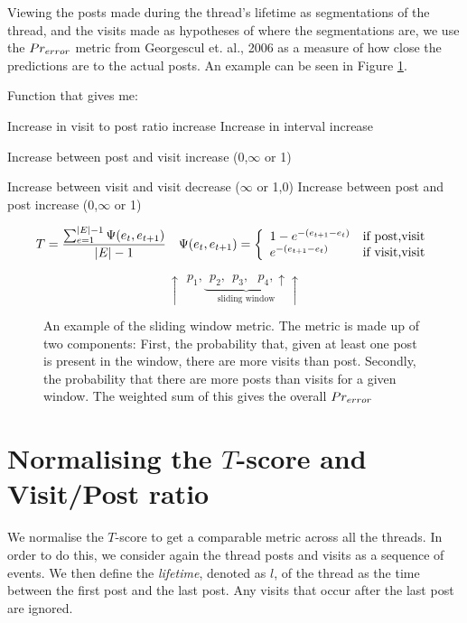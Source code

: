 Viewing the posts made during the thread's lifetime as segmentations of the 
thread, and the visits made as hypotheses of where the segmentations are, we use 
the $Pr_{error}$ metric from Georgescul et. al., 2006 as a measure of how close 
the predictions are to the actual posts. An example can be seen in Figure 
\ref{prerror}.



Function that gives me:

Increase in visit to post ratio		increase
Increase in interval				increase

Increase between post and visit		increase
(0,$\infty$ or 1)

Increase between visit and visit	decrease
($\infty$ or 1,0)
Increase between post and post		increase
(0,$\infty$ or 1)

\[
	\begin{array}{l l}
	T = \dfrac{%
		\sum_{e=1}^{|E|-1} \Psi(e_t,e_{t+1}) %
	}{|E|-1} &
		\Psi(e_t,e_{t+1}) = \left\{\begin{array}{l l}
				1-e^{-(e_{t+1} - e_t)}	& \text{if post,visit}\\
				e^{-(e_{t+1} - e_t)}			& \text{if visit,visit}\\
		\end{array}\right.
\end{array}
\]

\begin{figure}
\[
	\uparrow~~p_1,\underbrace{~~p_2,~~p_3,~~~p_4,\uparrow}_{\text{sliding window}}\uparrow
\]
\caption{An example of the sliding window metric. The metric is made up of two components: First, the probability that, given at least one post is present in the window, there are more visits than post. Secondly, the probability that there are more posts than visits for a given window. The weighted sum of this gives the overall $Pr_{error}$}\label{prerror}
\end{figure}


\section{Normalising the $T$-score and Visit/Post ratio}
We normalise the $T$-score to get a comparable metric across all the threads. In 
order to do this, we consider again the thread posts and visits as a sequence of 
events. We then define the \emph{lifetime}, denoted as $l$, of the thread as the 
time between the first post and the last post. Any visits that occur after the 
last post are ignored.

